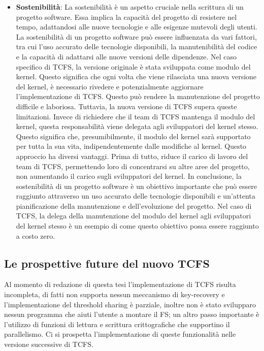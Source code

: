 \begin{itemize}
    \item \textbf{Sostenibilità}: La sostenibilità è un aspetto cruciale nella scrittura di un progetto software. Essa implica la capacità del progetto di resistere nel tempo, adattandosi alle nuove tecnologie e alle esigenze mutevoli degli utenti. La sostenibilità di un progetto software può essere influenzata da vari fattori, tra cui l’uso accurato delle tecnologie disponibili, la manutenibilità del codice e la capacità di adattarsi alle nuove versioni delle dipendenze. Nel caso specifico di TCFS, la versione originale è stata sviluppata come modulo del kernel. Questo significa che ogni volta che viene rilasciata una nuova versione del kernel, è necessario rivedere e potenzialmente aggiornare l’implementazione di TCFS. Questo può rendere la manutenzione del progetto difficile e laboriosa. Tuttavia, la nuova versione di TCFS supera queste limitazioni. Invece di richiedere che il team di TCFS mantenga il modulo del kernel, questa responsabilità viene delegata agli sviluppatori del kernel stesso. Questo significa che, presumibilmente, il modulo del kernel sarà supportato per tutta la sua vita, indipendentemente dalle modifiche al kernel. Questo approccio ha diversi vantaggi. Prima di tutto, riduce il carico di lavoro del team di TCFS, permettendo loro di concentrarsi su altre aree del progetto, non aumentando il carico sugli sviluppatori del kernel. In conclusione, la sostenibilità di un progetto software è un obiettivo importante che può essere raggiunto attraverso un uso accurato delle tecnologie disponibili e un’attenta pianificazione della manutenzione e dell’evoluzione del progetto. Nel caso di TCFS, la delega della manutenzione del modulo del kernel agli sviluppatori del kernel stesso è un esempio di come questo obiettivo possa essere raggiunto a costo zero.
\end{itemize}

\subsection{Le prospettive future del nuovo TCFS}
Al momento di redazione di questa tesi l'implementazione di TCFS risulta incompleta, di fatti non supporta nessun meccanismo di key-recovery e l'implementazione del threshold sharing è parziale, inoltre non è stato svilupparo nessun programma che aiuti l'utente a montare il FS; un altro passo importante è l'utilizzo di funzioni di lettura e scrittura crittografiche che supportino il parallelismo. Ci si prospetta l'implementazione di queste funzionalità nelle versione successive di TCFS. 

